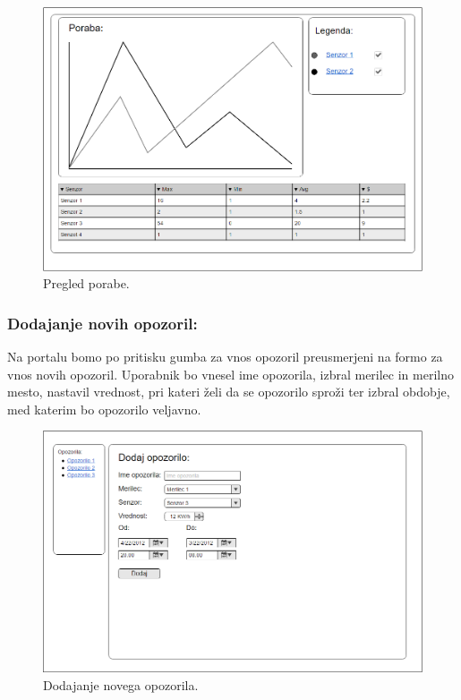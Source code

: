 \documentclass[12pt,a4paper,titlepage,openany]{report}
\begin{document}
\begin{figure}[H]
\begin{center}
\includegraphics[width=1\linewidth]{Slike/PregledPorabe.png}
\end{center}
\caption{Pregled porabe.}\label{slika:PregledPorabe}
\end{figure}

\subsubsection{Dodajanje novih opozoril:}
Na portalu bomo po pritisku gumba za vnos opozoril preusmerjeni na formo za vnos novih opozoril. Uporabnik bo vnesel ime opozorila, izbral merilec in merilno mesto, nastavil vrednost, pri kateri želi da se opozorilo sproži ter izbral obdobje, med katerim bo opozorilo veljavno.


\begin{figure}[H]
\begin{center}
\includegraphics[width=1\linewidth]{Slike/DodajOpozorilo.png}
\end{center}
\caption{Dodajanje novega opozorila.}\label{slika:DodajOpozorilo}
\end{figure}
\end{document}
